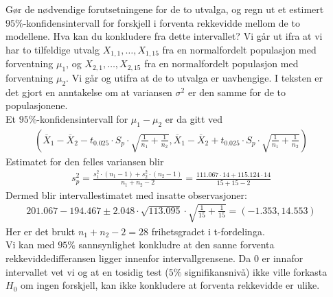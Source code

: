 \documentclass[final,hyperref={pdfpagelabels=false}]{beamer}
\newcommand{\matte}[1]{\vspace{-3mm}\begin{align*}#1\end{align*}}
\newcommand{\ol}[0]{\overline}
\begin{document}
\begin{frame}{}
\begin{columns}[t]
\begin{column}{.33\linewidth}
\begin{block}{}
{					Gør de nødvendige forutsetningene for de to utvalga, og regn ut et estimert $95\%$-konfidensintervall for forskjell i forventa rekkevidde mellom de to modellene.
					Hva kan du konkludere fra dette intervallet?}
				{Vi går ut ifra at vi har to tilfeldige utvalg $X_{1,1},\ldots,X_{1,15}$ fra en normalfordelt populasjon med forventning $\mu_1$, og $X_{2,1},\ldots,X_{2,15}$ fra en normalfordelt populasjon med forventning $\mu_2$.
					Vi går og utifra at de to utvalga er uavhengige.
					I teksten er det gjort en anntakelse om at variansen $\sigma^2$ er den samme for de to populasjonene.\\
					Et $95\%$-konfidensintervall for $\mu_1-\mu_2$ er da gitt ved
					\matte{\left(\ol X_1 -\ol X_2-t_{0.025}\cdot S_p\cdot\sqrt{\frac{1}{n_1}+\frac{1}{n_2}},\ol X_1 -\ol X_2+t_{0.025}\cdot S_p\cdot\sqrt{\frac{1}{n_1}+\frac{1}{n_2}} \right)}
					Estimatet for den felles variansen blir
					\matte{s_p^2=\frac{s_1^2\cdot(n_1-1)+s_2^2\cdot(n_2-1)}{n_1+n_2-2}=\frac{111.067\cdot 14 + 115.124 \cdot 14}{15+15-2}}
					Dermed blir intervallestimatet med insatte observasjoner:
					\matte{201.067-194.467\pm2.048\cdot\sqrt{113.095}\cdot\sqrt{\frac{1}{15}+\frac{1}{15}}=(-1.353,14.553)}
					Her er det brukt $n_1+n_2-2=28$ frihetsgradet i t-fordelinga.\\
					Vi kan med $95\%$ sannsynlighet konkludre at den sanne forventa rekkeviddedifferansen ligger innenfor intervallgrensene.
					Da $0$ er innafor intervallet vet vi og at en tosidig test ($5\%$ signifikansnivå) ikke ville forkasta $H_0$ om ingen forskjell, kan ikke konkludere at forventa rekkevidde er ulike.
				}
			\end{block}
		\end{column}
		\begin{column}{.33\linewidth}
			\begin{block}{}
			\end{block}
		\end{column}
	\end{columns}
\end{frame}
\end{document}
